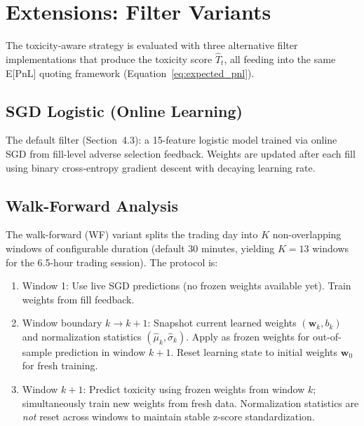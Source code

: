 \documentclass[11pt]{article}
\theoremstyle{definition}
\begin{document}
\section{Extensions: Filter Variants}
\label{sec:extensions}

The toxicity-aware strategy is evaluated with three alternative filter implementations that produce the toxicity score $\hat{T}_t$, all feeding into the same E[PnL] quoting framework (Equation~\ref{eq:expected_pnl}).

\subsection{SGD Logistic (Online Learning)}

The default filter (Section~4.3): a 15-feature logistic model trained via online SGD from fill-level adverse selection feedback. Weights are updated after each fill using binary cross-entropy gradient descent with decaying learning rate.

\subsection{Walk-Forward Analysis}
\label{sec:walkforward}

The walk-forward (WF) variant splits the trading day into $K$ non-overlapping windows of configurable duration (default 30 minutes, yielding $K = 13$ windows for the 6.5-hour trading session). The protocol is:

\begin{enumerate}
\item Window 1: Use live SGD predictions (no frozen weights available yet). Train weights from fill feedback.
\item Window boundary $k \to k+1$: Snapshot current learned weights $(\mathbf{w}_k, b_k)$ and normalization statistics $(\hat{\mu}_k, \hat{\sigma}_k)$. Apply as frozen weights for out-of-sample prediction in window $k+1$. Reset learning state to initial weights $\mathbf{w}_0$ for fresh training.
\item Window $k+1$: Predict toxicity using frozen weights from window $k$; simultaneously train new weights from fresh data. Normalization statistics are \emph{not} reset across windows to maintain stable z-score standardization.
\end{enumerate}
\end{document}
